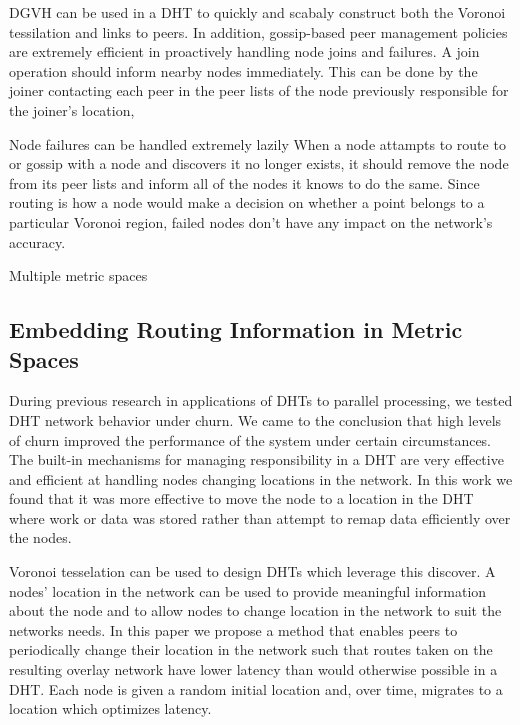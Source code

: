 \documentclass[11pt, conference, letterpaper]{IEEEtran}
\begin{document}
DGVH can be used in a DHT to quickly and scabaly construct both the Voronoi tessilation and links to peers.
In addition, gossip-based peer management policies are extremely efficient in proactively handling node joins and failures.
A join operation should inform nearby nodes immediately.
This can be done by the joiner contacting each peer in the peer lists of the node previously responsible for the joiner's location, 

Node failures can be handled extremely lazily
When a node attampts to route to or gossip with a node and discovers it no longer exists, it should remove the node from its peer lists and inform all of the nodes it knows to do the same.
Since routing is how a node would make a decision on whether a point belongs to a particular Voronoi region, failed nodes don't have any impact on the network's accuracy.



Multiple metric spaces



\subsection{Embedding Routing Information in Metric Spaces}


During previous research in applications of DHTs \cite{andrew-poster} to parallel processing, we tested DHT network behavior under churn. 
We came to the conclusion that high levels of churn improved the performance of the system under certain circumstances.
The built-in mechanisms for managing responsibility in a DHT are very effective and efficient at handling nodes changing locations in the network.
In this work we found that it was more effective to move the node to a location in the DHT where work or data was stored rather than attempt to remap data efficiently over the nodes.


Voronoi tesselation can be used to design DHTs which leverage this discover.
A nodes' location in the network can be used to provide meaningful information about the node and to allow nodes to change location in the network to suit the networks needs.
In this paper we propose a method that enables peers to periodically change their location in the network such that routes taken on the resulting overlay network have lower latency than would otherwise possible in a DHT.
Each node is given a random initial location and, over time, migrates to a location which optimizes latency.
\end{document}
